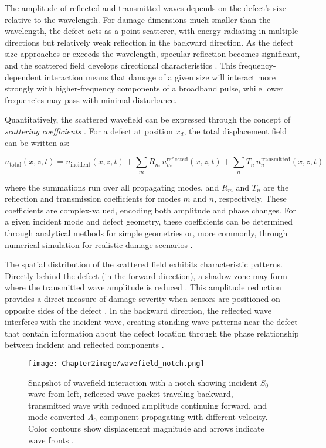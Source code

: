 \documentclass[12pt,a4paper]{report}
\begin{document}
The amplitude of reflected and transmitted waves depends on the defect's size relative to the wavelength. For damage dimensions much smaller than the wavelength, the defect acts as a point scatterer, with energy radiating in multiple directions but relatively weak reflection in the backward direction. As the defect size approaches or exceeds the wavelength, specular reflection becomes significant, and the scattered field develops directional characteristics \citep{rose2014ultrasonic}. This frequency-dependent interaction means that damage of a given size will interact more strongly with higher-frequency components of a broadband pulse, while lower frequencies may pass with minimal disturbance.

Quantitatively, the scattered wavefield can be expressed through the concept of \textit{scattering coefficients} \citep{ahn2021lamb}. For a defect at position $x_d$, the total displacement field can be written as:

\begin{equation}
u_{\text{total}}(x,z,t) = u_{\text{incident}}(x,z,t) + 
\sum_{m} R_m \, u_m^{\text{reflected}}(x,z,t) + 
\sum_{n} T_n \, u_n^{\text{transmitted}}(x,z,t)
\end{equation}

where the summations run over all propagating modes, and $R_m$ and $T_n$ are the reflection and transmission coefficients for modes $m$ and $n$, respectively. These coefficients are complex-valued, encoding both amplitude and phase changes. For a given incident mode and defect geometry, these coefficients can be determined through analytical methods for simple geometries or, more commonly, through numerical simulation for realistic damage scenarios \citep{ahn2021lamb,rose2014ultrasonic}.

The spatial distribution of the scattered field exhibits characteristic patterns. Directly behind the defect (in the forward direction), a shadow zone may form where the transmitted wave amplitude is reduced \citep{Im}. This amplitude reduction provides a direct measure of damage severity when sensors are positioned on opposite sides of the defect \citep{na2021review}. In the backward direction, the reflected wave interferes with the incident wave, creating standing wave patterns near the defect that contain information about the defect location through the phase relationship between incident and reflected components \citep{rose2014ultrasonic}.

\begin{figure}[h]
\centering
\texttt{[image: Chapter2image/wavefield\_notch.png]}
\caption{Snapshot of wavefield interaction with a notch showing incident $S_0$ wave from left, reflected wave packet traveling backward, transmitted wave with reduced amplitude continuing forward, and mode-converted $A_0$ component propagating with different velocity. Color contours show displacement magnitude and arrows indicate wave fronts \citep{article}.}
\label{fig:wave_scattering}
\end{figure}
\end{document}
